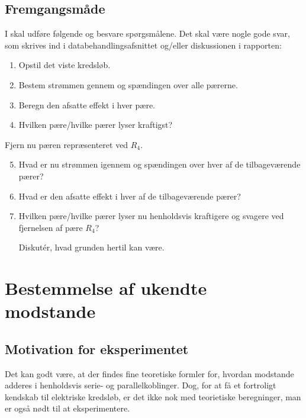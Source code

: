\documentclass[a4paper, 12pt]{article}
\begin{document}
\subsection{Fremgangsmåde}
\label{sec:org60b8e70}

I skal udføre følgende og besvare spørgsmålene. Det skal være nogle gode svar, som skrives ind i databehandlingsafsnittet og/eller diskussionen i rapporten:

\begin{enumerate}[noitemsep]
\item Opstil det viste kredsløb.
\item Bestem strømmen gennem og spændingen over alle pærerne.
\item Beregn den afsatte effekt i hver pære.
\item Hvilken pære/hvilke pærer lyser kraftigst?
\end{enumerate}

Fjern nu pæren repræsenteret ved \(R_4\).

\begin{enumerate}[noitemsep]
\setcounter{enumi}{4}
\item Hvad er nu strømmen igennem og spændingen over hver af de tilbageværende pærer?
\item Hvad er den afsatte effekt i hver af de tilbageværende pærer?
\item Hvilken pære/hvilke pærer lyser nu henholdsvis kraftigere og svagere ved fjernelsen af pære \(R_4\)?

Diskutér, hvad grunden hertil kan være.
\end{enumerate}

\newpage

\section{Bestemmelse af ukendte modstande}
\label{sec:orgeaae3e7}

\subsection{Motivation for eksperimentet}
\label{sec:orgaaa3d53}

Det kan godt være, at der findes fine teoretiske formler for, hvordan modstande adderes i henholdsvis serie- og parallelkoblinger. Dog, for at få et fortroligt kendskab til elektriske kredsløb, er det ikke nok med teorietiske beregninger, man er også nødt til at eksperimentere.
\end{document}
